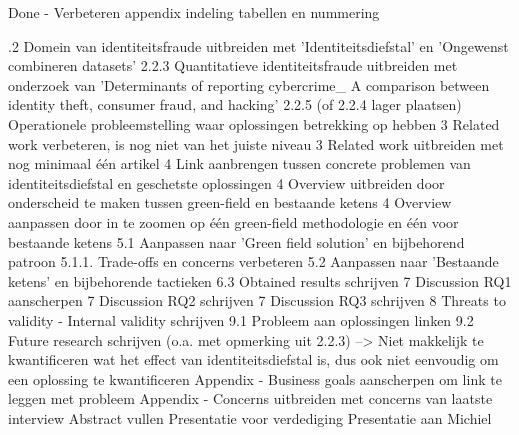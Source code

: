 \todo
Done - Verbeteren appendix indeling tabellen en nummering

.2 Domein van identiteitsfraude uitbreiden met 'Identiteitsdiefstal' en 'Ongewenst combineren datasets'
2.2.3 Quantitatieve identiteitsfraude uitbreiden met onderzoek van 'Determinants of reporting cybercrime_ A
comparison between identity theft, consumer fraud, and hacking'
2.2.5 (of 2.2.4 lager plaatsen) Operationele probleemstelling waar oplossingen betrekking op hebben
3 Related work verbeteren, is nog niet van het juiste niveau
3 Related work uitbreiden met nog minimaal één artikel
4 Link aanbrengen tussen concrete problemen van identiteitsdiefstal en geschetste oplossingen
4 Overview uitbreiden door onderscheid te maken tussen green-field en bestaande ketens
4 Overview aanpassen door in te zoomen op één green-field methodologie en één voor bestaande ketens
5.1 Aanpassen naar 'Green field solution' en bijbehorend patroon
5.1.1. Trade-offs en concerns verbeteren
5.2 Aanpassen naar 'Bestaande ketens' en bijbehorende tactieken
6.3 Obtained results schrijven
7 Discussion RQ1 aanscherpen
7 Discussion RQ2 schrijven
7 Discussion RQ3 schrijven
8 Threats to validity - Internal validity schrijven
9.1 Probleem aan oplossingen linken
9.2 Future research schrijven (o.a. met opmerking uit 2.2.3) --> Niet makkelijk te kwantificeren wat het effect van identiteitsdiefstal is, dus ook niet eenvoudig om een oplossing te kwantificeren
Appendix - Business goals aanscherpen om link te leggen met probleem
Appendix - Concerns uitbreiden met concerns van laatste interview
Abstract vullen
Presentatie voor verdediging
Presentatie aan Michiel